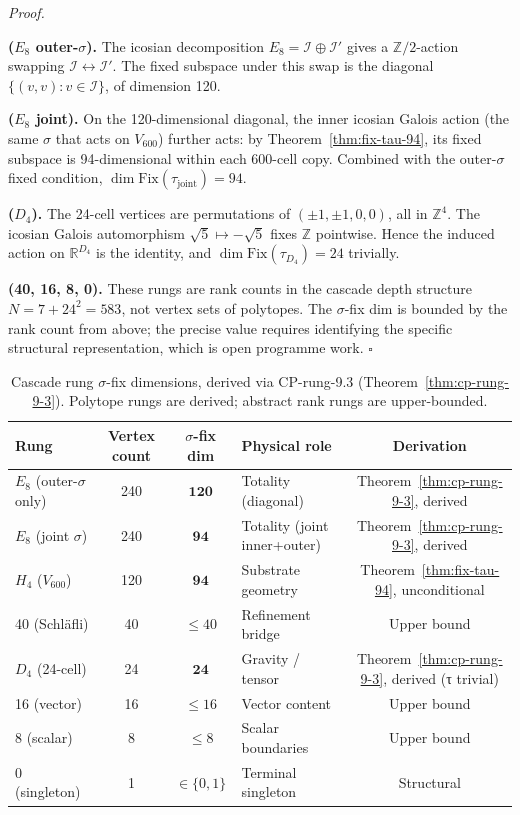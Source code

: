 \documentclass[11pt]{article}
\theoremstyle{plain}
\theoremstyle{definition}
\theoremstyle{remark}
\newcommand{\Ical}{\mathcal{I}}
\newcommand{\Fix}{\mathrm{Fix}}
\begin{document}
\noindent\emph{Proof.}

\textbf{($E_8$ outer-$\sigma$).} The icosian decomposition $E_8 = \Ical \oplus \Ical'$ gives a $\mathbb{Z}/2$-action swapping $\Ical \leftrightarrow \Ical'$. The fixed subspace under this swap is the diagonal $\{(v, v) : v \in \Ical\}$, of dimension 120.

\textbf{($E_8$ joint).} On the 120-dimensional diagonal, the inner icosian Galois action (the same $\sigma$ that acts on $V_{600}$) further acts: by Theorem~\ref{thm:fix-tau-94}, its fixed subspace is 94-dimensional within each 600-cell copy. Combined with the outer-$\sigma$ fixed condition, $\dim \Fix(\tau_{\mathrm{joint}}) = 94$.

\textbf{($D_4$).} The 24-cell vertices are permutations of $(\pm 1, \pm 1, 0, 0)$, all in $\mathbb{Z}^4$. The icosian Galois automorphism $\sqrt 5 \mapsto -\sqrt 5$ fixes $\mathbb{Z}$ pointwise. Hence the induced action on $\mathbb{R}^{D_4}$ is the identity, and $\dim \Fix(\tau_{D_4}) = 24$ trivially.

\textbf{(40, 16, 8, 0).} These rungs are rank counts in the cascade depth structure $N = 7 + 24^2 = 583$, not vertex sets of polytopes. The $\sigma$-fix dim is bounded by the rank count from above; the precise value requires identifying the specific structural representation, which is open programme work. \hfill$\square$

\begin{table}[h]
\centering
\small
\caption{Cascade rung $\sigma$-fix dimensions, derived via CP-rung-9.3 (Theorem~\ref{thm:cp-rung-9-3}). Polytope rungs are derived; abstract rank rungs are upper-bounded.}\label{tab:rung-sigma-fix}
\begin{tabular}{lcclc}
\toprule
Rung & Vertex count & $\sigma$-fix dim & Physical role & Derivation \\
\midrule
$E_8$ (outer-$\sigma$ only) & 240 & $\mathbf{120}$ & Totality (diagonal) & Theorem~\ref{thm:cp-rung-9-3}, derived \\
$E_8$ (joint $\sigma$) & 240 & $\mathbf{94}$ & Totality (joint inner+outer) & Theorem~\ref{thm:cp-rung-9-3}, derived \\
$H_4$ ($V_{600}$) & 120 & $\mathbf{94}$ & Substrate geometry & Theorem~\ref{thm:fix-tau-94}, unconditional \\
40 (Schläfli) & 40 & $\leq 40$ & Refinement bridge & Upper bound \\
$D_4$ (24-cell) & 24 & $\mathbf{24}$ & Gravity / tensor & Theorem~\ref{thm:cp-rung-9-3}, derived (τ trivial) \\
16 (vector) & 16 & $\leq 16$ & Vector content & Upper bound \\
8 (scalar) & 8 & $\leq 8$ & Scalar boundaries & Upper bound \\
0 (singleton) & 1 & $\in \{0, 1\}$ & Terminal singleton & Structural \\
\bottomrule
\end{tabular}
\end{table}
\end{document}
